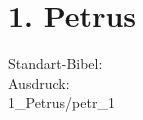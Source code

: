 \section{1. Petrus}
Standart-Bibel: \getdefault \\
Ausdruck: \getversions \\        
 {1_Petrus/petr_1} 
